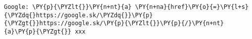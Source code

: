 \begin{Verbatim}[commandchars=\\\{\}]
Google: \PY{p}{\PYZlt{}}\PY{n+nt}{a} \PY{n+na}{href}\PY{o}{=}\PY{l+s}{\PYZdq{}https://google.sk/\PYZdq{}}\PY{p}{\PYZgt{}}https://google.sk/\PY{p}{\PYZlt{}}\PY{p}{/}\PY{n+nt}{a}\PY{p}{\PYZgt{}} xxx
\end{Verbatim}
